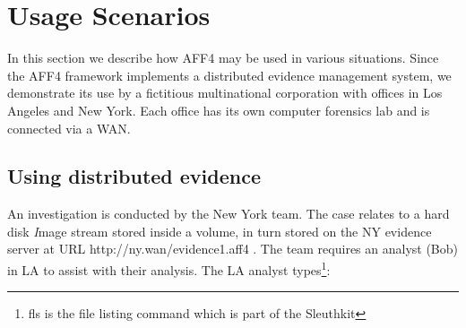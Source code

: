 \documentclass[10pt, conference]{IEEEtran}
\begin{document}



\section{Usage Scenarios}
In this section we describe how AFF4 may be used in various
situations. Since the AFF4 framework implements a distributed evidence
management system, we demonstrate its use by a fictitious
multinational corporation with offices in Los Angeles and New
York. Each office has its own computer forensics lab and is connected
via a WAN.

\subsection{Using distributed evidence}
An investigation is conducted by the New York team. The case relates
to a hard disk {\emph Image stream} stored inside a volume, in turn
stored on the NY evidence server at URL http://ny.wan/evidence1.aff4
. The team requires an analyst (Bob) in LA to assist with their
analysis. The LA analyst types\footnote{fls is the file listing
command which is part of the Sleuthkit}:
\end{document}
